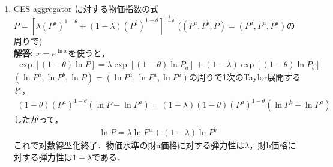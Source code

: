 \documentclass[a4paper,12pt,onecolumn,oneside,notitlepage,final]{article}
\begin{document}
\begin{enumerate}
\item CES aggregator に対する物価指数の式 $P = \left[\lambda (P^a)^{1-\theta} + (1-\lambda) (P^b)^{1-\theta}\right]^\frac{1}{1-\theta}$ \quad ($(P^a, P^b, P) = (P^a, P^a, P^a)$の周りで)\\

{\bf 解答:} $x=e^{\ln x}$を使うと，
\begin{align*}
\exp\left[(1-\theta) \ln P\right] = \lambda \exp\left[(1-\theta) \ln P_a \right] + (1-\lambda) \exp\left[(1-\theta)\ln P_b\right] 
\end{align*}
$(\ln P^a, \ln P^b, \ln P) = (\ln P^a, \ln P^a, \ln P^a)$の周りで1次のTaylor展開すると，
\begin{align*}
(1-\theta) (P^a)^{1-\theta} (\ln P - \ln P^a) = (1-\lambda) (1-\theta) (P^a)^{1-\theta} (\ln P^b - \ln P^a)
\end{align*}
したがって，
\begin{align*}
\ln P = \lambda \ln P^a + (1-\lambda) \ln P^b
\end{align*}
これで対数線型化終了．物価水準の財a価格に対する弾力性は$\lambda$，財b価格に対する弾力性は$1-\lambda$である．
\end{enumerate}
\end{document}
